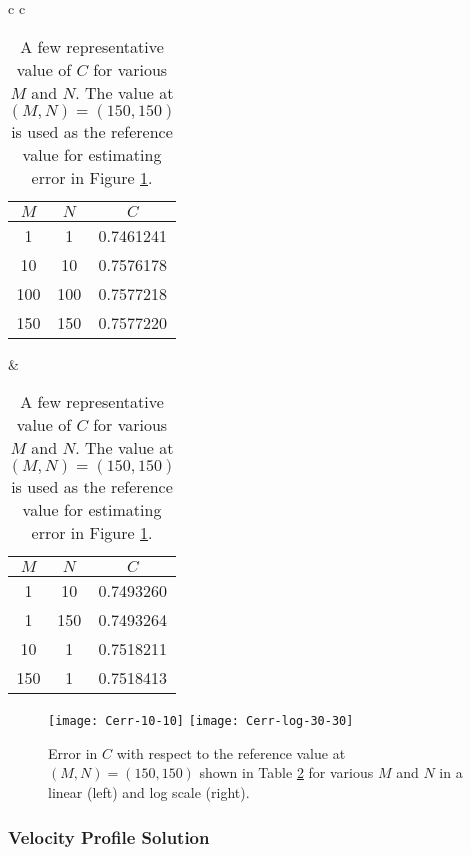 \documentclass[11pt, a4paper]{article}
\begin{document}
\begin{table}[htb!]
	\begin{adjustbox}{center}

  	\begin{tabular}{c c}
  
	\begin{tabular}[t]{|c|c|c|}
		\hline {\rule{0pt}{2.3ex}} \hspace{-7pt}
		$ M $ & $ N $ & $ C $\\
		\hline
		\hline {\rule{0pt}{2.3ex}} \hspace{-7pt}
		1 & 1 		& 0.7461241 \\
		10 & 10 	& 0.7576178 \\
		100 & 100 	& 0.7577218 \\
		150 & 150  	& 0.7577220 \\
		\hline 
	\end{tabular}
	\hspace{5mm}
	&
	\hspace{5mm}
	\begin{tabular}[t]{|c|c|c|}
		\hline {\rule{0pt}{2.3ex}} \hspace{-7pt}
		$ M $ & $ N $ & $ C $\\
		\hline
		\hline {\rule{0pt}{2.3ex}} \hspace{-7pt}
		1 & 10 		& 0.7493260 \\
		1 & 150 	& 0.7493264 \\
		10 & 1 		& 0.7518211 \\
		150 & 1		& 0.7518413 \\
		\hline
	\end{tabular}
  	\end{tabular}
	\end{adjustbox}
	\caption{A few representative value of $ C $ for various $ M $ and $ N $. The value at $ (M, N) = (150, 150) $ is used as the reference value for estimating error in Figure \ref{gal:fig:C_err}.}
	\label{gal:table:C}
\end{table}


\begin{figure}[H]
\centering
\texttt{[image: Cerr-10-10]} \hfill
\texttt{[image: Cerr-log-30-30]} \hfill
\caption{Error in $ C $ with respect to the reference value at $ (M, N) = (150, 150) $ shown in Table \ref{gal:table:C} for various $ M $ and $ N $ in a linear (left) and log scale (right).}
\label{gal:fig:C_err}
\end{figure}

\subsubsection{Velocity Profile Solution}
\end{document}

